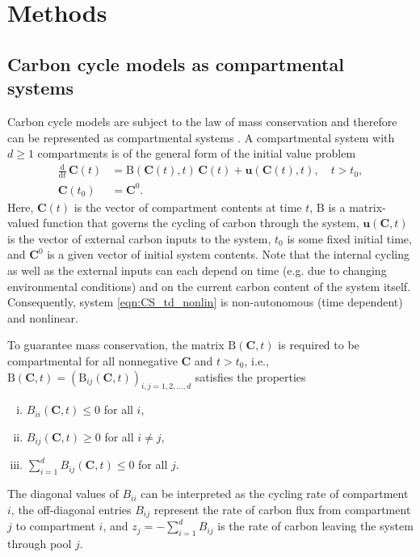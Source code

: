 \documentclass[draft]{agujournal2019}
\renewcommand{\vec}[1]{\mathbf{#1}}
\newcommand{\tens}[1]{\mathrm{#1}}
\newcommand{\deriv}[1]{\frac{\mathrm{d}}{\mathrm{d}#1}}
\newcommand{\suml}{\sum\limits}
\begin{document}
\section{Methods}
\subsection{Carbon cycle models as compartmental systems}
Carbon cycle models are subject to the law of mass conservation and therefore can be represented as compartmental systems \cite{Anderson1983, Jacquez1993}. A compartmental system with $d\geq1$ compartments is of the general form of the initial value problem
    \begin{equation}\label{eqn:CS_td_nonlin}
        \begin{aligned}
            \deriv{t}\,\vec{C}(t) &= \tens{B}(\vec{C}(t),t)\,\vec{C}(t) + \vec{u}(\vec{C}(t),t),\quad t>t_0,\\
            \vec{C}(t_0) &= \vec{C}^0.
        \end{aligned}
    \end{equation}Here, $\vec{C}(t)$ is the vector of compartment contents at time $t$, $\tens{B}$ is a matrix-valued function that governs the cycling of carbon through the system, $\vec{u}(\vec{C},t)$ is the vector of external carbon inputs to the system, $t_0$ is some fixed initial time, and $\vec{C}^0$ is a given vector  of initial system contents. Note that the internal cycling as well as the external inputs can each depend on time (e.g. due to changing environmental conditions) and on the current carbon content of the system itself. Consequently, system \eqref{eqn:CS_td_nonlin} is non-autonomous (time dependent) and nonlinear.
    
To guarantee mass conservation, the matrix $\tens{B}(\vec{C},t)$ is required to be compartmental 
for all nonnegative $\vec{C}$ and $t>t_0$, i.e., $\tens{B}(\vec{C},t)=(\tens{B}_{ij}(\vec{C},t))_{i,j=1,2,\ldots,d}$ satisfies the properties
    \begin{enumerate}[(i)]
        \item $B_{ii}(\vec{C},t)\leq0$ for all $i$,
        \item $B_{ij}(\vec{C},t)\geq0$ for all $i\neq j$,
        \item $\suml_{i=1}^d B_{ij}(\vec{C},t)\leq0$ for all $j$.
    \end{enumerate}
The diagonal values of $B_{ii}$ can be interpreted as the cycling rate of compartment $i$, the off-diagonal entries $B_{ij}$ represent the rate of carbon flux from compartment $j$ to compartment $i$, and $z_j=-\sum_{i=1}^d B_{ij}$ is the rate of carbon leaving the system through pool $j$.
    
\end{document}
